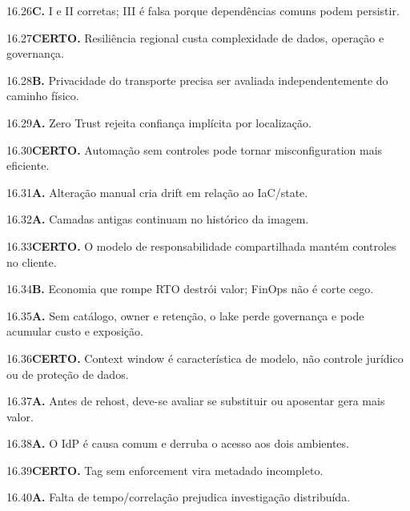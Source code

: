 \begin{solucao}{16.26}\textbf{C.} I e II corretas; III é falsa porque dependências comuns podem persistir.\end{solucao}
\begin{solucao}{16.27}\textbf{CERTO.} Resiliência regional custa complexidade de dados, operação e governança.\end{solucao}
\begin{solucao}{16.28}\textbf{B.} Privacidade do transporte precisa ser avaliada independentemente do caminho físico.\end{solucao}
\begin{solucao}{16.29}\textbf{A.} Zero Trust rejeita confiança implícita por localização.\end{solucao}
\begin{solucao}{16.30}\textbf{CERTO.} Automação sem controles pode tornar misconfiguration mais eficiente.\end{solucao}
\begin{solucao}{16.31}\textbf{A.} Alteração manual cria drift em relação ao IaC/state.\end{solucao}
\begin{solucao}{16.32}\textbf{A.} Camadas antigas continuam no histórico da imagem.\end{solucao}
\begin{solucao}{16.33}\textbf{CERTO.} O modelo de responsabilidade compartilhada mantém controles no cliente.\end{solucao}
\begin{solucao}{16.34}\textbf{B.} Economia que rompe RTO destrói valor; FinOps não é corte cego.\end{solucao}
\begin{solucao}{16.35}\textbf{A.} Sem catálogo, owner e retenção, o lake perde governança e pode acumular custo e exposição.\end{solucao}
\begin{solucao}{16.36}\textbf{CERTO.} Context window é característica de modelo, não controle jurídico ou de proteção de dados.\end{solucao}
\begin{solucao}{16.37}\textbf{A.} Antes de rehost, deve-se avaliar se substituir ou aposentar gera mais valor.\end{solucao}
\begin{solucao}{16.38}\textbf{A.} O IdP é causa comum e derruba o acesso aos dois ambientes.\end{solucao}
\begin{solucao}{16.39}\textbf{CERTO.} Tag sem enforcement vira metadado incompleto.\end{solucao}
\begin{solucao}{16.40}\textbf{A.} Falta de tempo/correlação prejudica investigação distribuída.\end{solucao}

